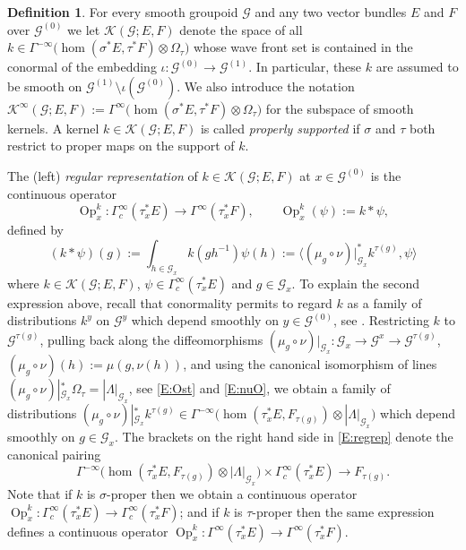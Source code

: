 \documentclass[reqno,12pt]{amsart}
\DeclareMathOperator{\Op}{Op}
\theoremstyle{plain}
\theoremstyle{definition}
\newtheorem{definition}[theorem]{Definition}
\begin{document}
\begin{definition}\label{D:KGEF}
For every smooth groupoid $\mathcal G$ and any two vector bundles $E$ and $F$ over $\mathcal G^{(0)}$ we let $\mathcal K(\mathcal G;E,F)$ denote the space of all 
$k\in\Gamma^{-\infty}\bigl(\hom(\sigma^*E,\tau^*F)\otimes\Omega_\tau\bigr)$ whose wave front set is contained in the conormal of the embedding 
$\iota\colon\mathcal G^{(0)}\to\mathcal G^{(1)}$.
In particular, these $k$ are assumed to be smooth on $\mathcal G^{(1)}\setminus\iota(\mathcal G^{(0)})$.
We also introduce the notation $\mathcal K^\infty(\mathcal G;E,F):=\Gamma^\infty\bigl(\hom(\sigma^*E,\tau^*F)\otimes\Omega_\tau\bigr)$ for the subspace of smooth kernels.
A kernel $k\in\mathcal K(\mathcal G;E,F)$ is called \emph{properly supported} if $\sigma$ and $\tau$ both restrict to proper maps on the support of $k$.
\end{definition}


The (left) \emph{regular representation} of $k\in\mathcal K(\mathcal G;E,F)$ at $x\in \mathcal G^{(0)}$ is the continuous operator
\begin{equation}\label{E:regrep0}
\Op_x^k\colon\Gamma^\infty_c(\tau_x^*E)\to\Gamma^\infty(\tau_x^*F),
\qquad\Op_x^k(\psi):=k*\psi,
\end{equation}
defined by
\begin{equation}\label{E:regrep}
(k*\psi)(g):=\int_{h\in\mathcal G_x}k(gh^{-1})\psi(h):=\langle(\mu_g\circ\nu)|_{\mathcal G_x}^*k^{\tau(g)},\psi\rangle
\end{equation}
where  $k\in\mathcal K(\mathcal G;E,F)$, $\psi\in\Gamma_c^\infty(\tau_x^*E)$ and $g\in\mathcal G_x$.
To explain the second expression above, recall that conormality permits to regard $k$ as a family of distributions $k^y$ on $\mathcal G^y$ which depend smoothly on $y\in\mathcal G^{(0)}$, see \cite{LMV15}.
Restricting $k$ to $\mathcal G^{\tau(g)}$, pulling back along the diffeomorphisms $(\mu_g\circ\nu)|_{\mathcal G_x}\colon\mathcal G_x\to\mathcal G^x\to\mathcal G^{\tau(g)}$, $(\mu_g\circ\nu)(h):=\mu(g,\nu(h))$, and using the canonical isomorphism of lines $(\mu_g\circ\nu)|_{\mathcal G_x}^*\Omega_\tau=|\Lambda|_{\mathcal G_x}$, see \eqref{E:Ost} and \eqref{E:nuO}, we obtain a family of distributions $(\mu_g\circ\nu)|_{\mathcal G_x}^*k^{\tau(g)}\in\Gamma^{-\infty}\bigl(\hom(\tau_x^*E,F_{\tau(g)})\otimes|\Lambda|_{\mathcal G_x}\bigr)$ which depend smoothly on $g\in\mathcal G_x$.
The brackets on the right hand side in \eqref{E:regrep} denote the canonical pairing 
$$
\Gamma^{-\infty}\bigl(\hom(\tau_x^*E,F_{\tau(g)})\otimes|\Lambda|_{\mathcal G_x}\bigr)\times\Gamma^\infty_c(\tau_x^*E)\to F_{\tau(g)}.
$$
Note that if $k$ is $\sigma$-proper then we obtain a continuous operator $\Op_x^k\colon\Gamma^\infty_c(\tau_x^*E)\to\Gamma^\infty_c(\tau_x^*F)$;
and if $k$ is $\tau$-proper then the same expression defines a continuous operator $\Op_x^k\colon\Gamma^\infty(\tau_x^*E)\to\Gamma^\infty(\tau_x^*F)$.
\end{document}

